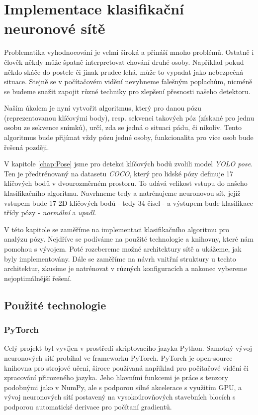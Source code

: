 \chapter{Implementace klasifikační neuronové sítě}
\label{chap:ClassificationImplementation}

Problematika vyhodnocování je velmi široká a přináší mnoho problémů. Ostatně i
člověk někdy může špatně interpretovat chování druhé osoby. Například pokud
někdo skáče do postele či jinak prudce lehá, může to vypadat jako nebezpečná
situace. Stejně se v počítačovém vidění nevyhneme falešným poplachům, nicméně
se budeme snažit zapojit různé techniky pro zlepšení přesnosti našeho
detektoru.

Naším úkolem je nyní vytvořit algoritmus, který pro danou pózu (reprezentovanou
klíčovými body), resp. sekvenci takových póz (získané pro jednu osobu ze
sekvence snímků), určí, zda se jedná o situaci pádu, či nikoliv. Tento
algoritmus bude přijímat vždy pózu jedné osoby, funkcionalita pro více osob
bude řešená později.

V kapitole \ref{chap:Pose} jsme pro detekci klíčových bodů zvolili model
\textit{YOLO pose}. Ten je předtrénovaný na datasetu \textit{COCO}, který pro
lidské pózy definuje 17 klíčových bodů v dvourozměrném prostoru. To udává
velikost vstupu do našeho klasifikačního algoritmu. Navrhneme tedy a
natrénujeme neuronovou síť, jejíž vstupem bude 17 2D klíčových bodů - tedy 34
čísel - a výstupem bude klasifikace třídy pózy - \textit{normální} a
\textit{upadl}.

V této kapitole se zaměříme na implementaci klasifikačního algoritmu pro
analýzu pózy. Nejdříve se podíváme na použité technologie a knihovny, které nám
pomohou s vývojem. Poté rozebereme možné architektury sítě a ukážeme, jak byly
implementovány. Dále se zaměříme na návrh vnitřní struktury u techto
architektur, zkusíme je natrénovat v různých konfiguracích a nakonec vybereme
nejoptimálnější řešení.

\section{Použité technologie}

\subsection{PyTorch}

Celý projekt byl vyvíjen v prostředí skriptovacího jazyka Python. Samotný vývoj
neuronových sítí probíhal ve frameworku PyTorch. PyTorch je open-source
knihovna pro strojové učení, široce používaná například pro počítačové vidění
či zpracování přirozeného jazyka. Jeho hlavními funkcemi je práce s tenzory
podobnými jako v NumPy, ale s podporou silné akcelerace s využitím GPU, a vývoj
neuronových sítí postavený na vysokoúrovňových stavebních blocích s podporou
automatické derivace pro počítaní gradientů.


